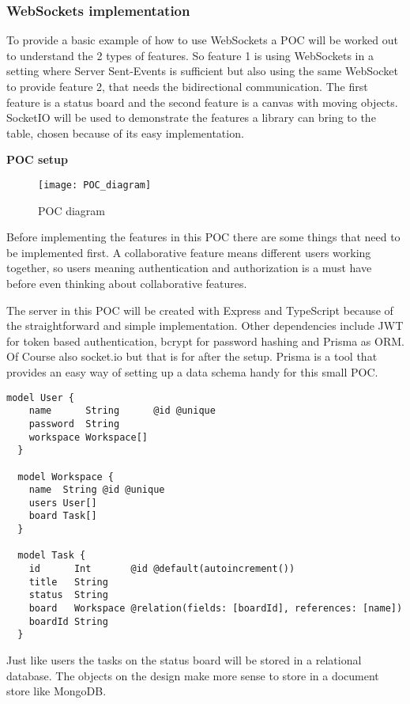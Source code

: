 \subsubsection{WebSockets implementation}

To provide a basic example of how to use WebSockets a POC will be worked out to understand the 2 types of features. So feature 1 is using WebSockets in a setting where Server Sent-Events is sufficient but also using the same WebSocket to provide feature 2, that needs the bidirectional communication. The first feature is a status board and the second feature is a canvas with moving objects. SocketIO will be used to demonstrate the features a library can bring to the table, chosen because of its easy implementation.

\textbf{POC setup}

\begin{figure}[h]
  \caption{POC diagram}
  \texttt{[image: POC\_diagram]}
  \centering
\end{figure}

Before implementing the features in this POC there are some things that need to be implemented first. A collaborative feature means different users working together, so users meaning authentication and authorization is a must have before even thinking about collaborative features.

The server in this POC will be created with Express and TypeScript because of the straightforward and simple implementation. Other dependencies include JWT for token based authentication, bcrypt for password hashing and Prisma as ORM. Of Course also socket.io but that is for after the setup. Prisma is a tool that provides an easy way of setting up a data schema handy for this small POC.

\begin{lstlisting}[caption=Prisma Data Schema]
  model User {
    name      String      @id @unique
    password  String
    workspace Workspace[]
  }

  model Workspace {
    name  String @id @unique
    users User[]
    board Task[]
  }

  model Task {
    id      Int       @id @default(autoincrement())
    title   String
    status  String
    board   Workspace @relation(fields: [boardId], references: [name])
    boardId String
  }
\end{lstlisting}

Just like users the tasks on the status board will be stored in a relational database. The objects on the design make more sense to store in a document store like MongoDB.

